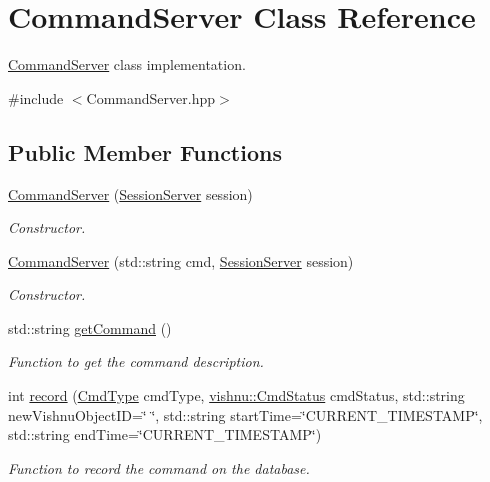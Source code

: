 \hypertarget{classCommandServer}{
\section{CommandServer Class Reference}
\label{classCommandServer}
}


\hyperlink{classCommandServer}{CommandServer} class implementation.  




{\ttfamily \#include $<$CommandServer.hpp$>$}

\subsection*{Public Member Functions}
\begin{DoxyCompactItemize}
\item 
\hyperlink{classCommandServer_aa15f07a3768c8b15ace8b470d3ff9b34}{CommandServer} (\hyperlink{classSessionServer}{SessionServer} session)
\begin{DoxyCompactList}\small\item\em Constructor. \item\end{DoxyCompactList}\item 
\hyperlink{classCommandServer_a1ed27508bf43e78ab53b9c8d1d6abcd7}{CommandServer} (std::string cmd, \hyperlink{classSessionServer}{SessionServer} session)
\begin{DoxyCompactList}\small\item\em Constructor. \item\end{DoxyCompactList}\item 
std::string \hyperlink{classCommandServer_a577cacdfa0a6542d39b8f399ff575ecf}{getCommand} ()
\begin{DoxyCompactList}\small\item\em Function to get the command description. \item\end{DoxyCompactList}\item 
int \hyperlink{classCommandServer_aa1ac01df3897b29b78a961bec8a2534b}{record} (\hyperlink{namespacevishnu_a89462b396eca68c9c1a94a06d2f39532}{CmdType} cmdType, \hyperlink{namespacevishnu_a5513f86dabac3cd717c915498a7679ad}{vishnu::CmdStatus} cmdStatus, std::string newVishnuObjectID=\char`\"{} \char`\"{}, std::string startTime=\char`\"{}CURRENT\_\-TIMESTAMP\char`\"{}, std::string endTime=\char`\"{}CURRENT\_\-TIMESTAMP\char`\"{})
\begin{DoxyCompactList}\small\item\em Function to record the command on the database. \item\end{DoxyCompactList}\item 

\end{DoxyCompactItemize}
